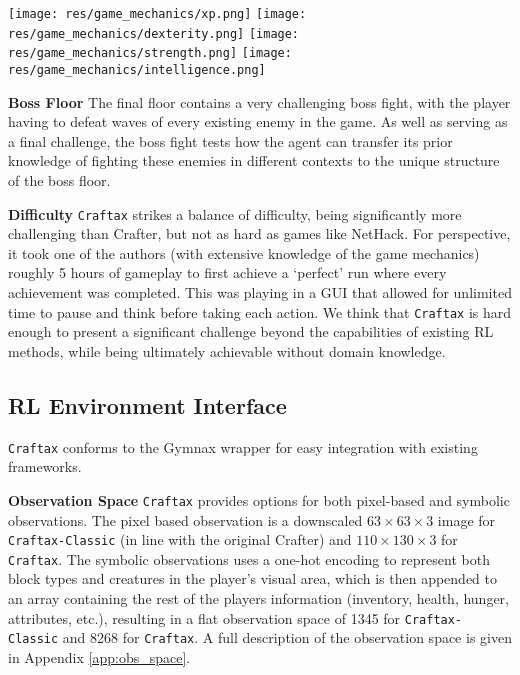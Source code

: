\documentclass{article}
\theoremstyle{plain}
\theoremstyle{definition}
\theoremstyle{remark}
\begin{document}
{\centering
\texttt{[image: res/game\_mechanics/xp.png]}
\texttt{[image: res/game\_mechanics/dexterity.png]}
\texttt{[image: res/game\_mechanics/strength.png]}
\texttt{[image: res/game\_mechanics/intelligence.png]}
\par}

\textbf{Boss Floor} The final floor contains a very challenging boss fight, with the player having to defeat waves of every existing enemy in the game.  As well as serving as a final challenge, the boss fight tests how the agent can transfer its prior knowledge of fighting these enemies in different contexts to the unique structure of the boss floor.

\textbf{Difficulty} \texttt{Craftax} strikes a balance of difficulty, being significantly more challenging than Crafter, but not as hard as games like NetHack.  For perspective, it took one of the authors (with extensive knowledge of the game mechanics) roughly 5 hours of gameplay to first achieve a `perfect' run where every achievement was completed.  This was playing in a GUI that allowed for unlimited time to pause and think before taking each action.  We think that \texttt{Craftax} is hard enough to present a significant challenge beyond the capabilities of existing RL methods, while being ultimately achievable without domain knowledge.

\subsection{RL Environment Interface}

\texttt{Craftax} conforms to the Gymnax \citep{gymnax2022github} wrapper for easy integration with existing frameworks.

\textbf{Observation Space} \texttt{Craftax} provides options for both pixel-based and symbolic observations.  The pixel based observation is a downscaled $63\times63\times3$ image for \texttt{Craftax-Classic} (in line with the original Crafter) and $110\times130\times3$ for \texttt{Craftax}.  The symbolic observations uses a one-hot encoding to represent both block types and creatures in the player's visual area, which is then appended to an array containing the rest of the players information (inventory, health, hunger, attributes, etc.), resulting in a flat observation space of 1345 for \texttt{Craftax-Classic} and 8268 for \texttt{Craftax}.  A full description of the observation space is given in Appendix \ref{app:obs_space}.
\end{document}
